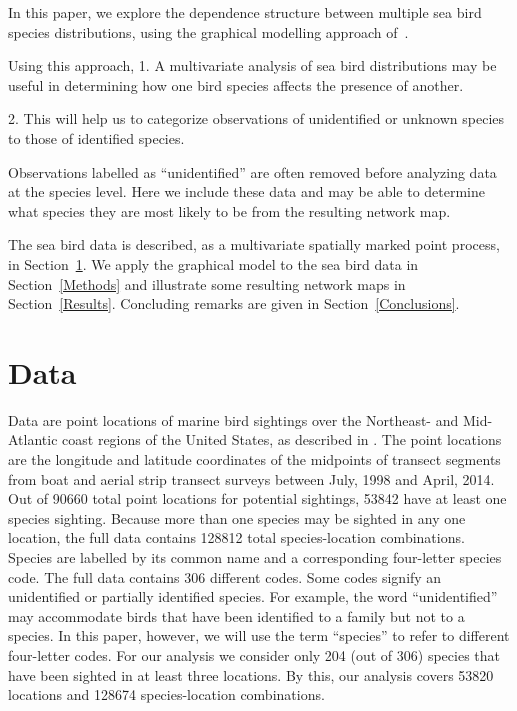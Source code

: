 \documentclass{statsoc}
\begin{document}
In this paper, we explore the dependence structure between multiple sea bird species distributions, using the graphical modelling approach of~\cite{Eckardt2016b}. %


Using this approach,
1. A multivariate analysis of sea bird distributions may be useful in determining how one bird species affects the presence of another. 

2. This will help us to categorize observations of unidentified or unknown species to those of identified species.  

Observations labelled as ``unidentified'' are often removed before analyzing data at the species level. Here we include these data and may be able to determine what species they are most likely to be from the resulting network map. 


The sea bird data is described, as a multivariate spatially marked point process, in Section~\ref{Data}. We apply the graphical model to the sea bird data in Section~\ref{Methods} and illustrate some resulting network maps in Section~\ref{Results}. Concluding remarks are given in Section~\ref{Conclusions}.
















\section{Data}\label{Data}




Data are point locations of marine bird sightings over the Northeast- and Mid-Atlantic coast regions of the United States, as described in \cite{Balderama2016}. The point locations are the longitude and latitude coordinates of the midpoints of transect segments from boat and aerial strip transect surveys between July, 1998 and April, 2014. Out of 90660 total point locations for potential sightings, 53842 have at least one species sighting. Because more than one species may be sighted in any one location, the full data contains 128812 total species-location combinations. Species are labelled by its common name and a corresponding four-letter species code. The full data contains 306 different codes. Some codes signify an unidentified or partially identified species. For example, the word ``unidentified'' may accommodate birds that have been identified to a family but not to a species. In this paper, however, we will use the term ``species'' to refer to different four-letter codes.
For our analysis we consider only 204 (out of 306) species that have been sighted in at least three locations. By this, our analysis covers 53820 locations and 128674 species-location combinations.
\end{document}
